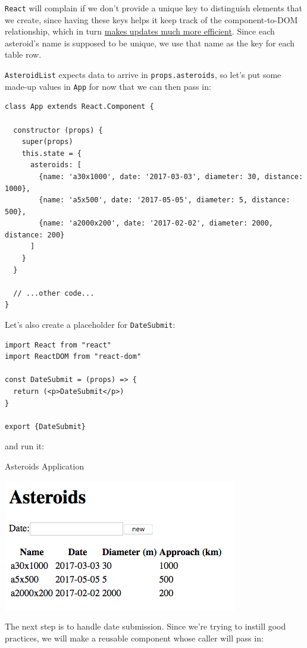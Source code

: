 \texttt{React} will complain if we don't provide a unique key to
distinguish elements that we create, since having these keys helps it
keep track of the component-to-DOM relationship, which in turn
\href{https://stackoverflow.com/questions/28329382/understanding-unique-keys-for-array-children-in-react-js}{makes
updates much more efficient}. Since each asteroid's name is supposed to
be unique, we use that name as the key for each table row.

\texttt{AsteroidList} expects data to arrive in
\texttt{props.asteroids}, so let's put some made-up values in
\texttt{App} for now that we can then pass in:

\begin{verbatim}
class App extends React.Component {

  constructor (props) {
    super(props)
    this.state = {
      asteroids: [
        {name: 'a30x1000', date: '2017-03-03', diameter: 30, distance: 1000},
        {name: 'a5x500', date: '2017-05-05', diameter: 5, distance: 500},
        {name: 'a2000x200', date: '2017-02-02', diameter: 2000, distance: 200}
      ]
    }
  }

  // ...other code...
}
\end{verbatim}

Let's also create a placeholder for \texttt{DateSubmit}:

\begin{verbatim}
import React from "react"
import ReactDOM from "react-dom"

const DateSubmit = (props) => {
  return (<p>DateSubmit</p>)
}

export {DateSubmit}
\end{verbatim}

and run it:

Asteroids Application

\includegraphics{../../files/interactive-asteroids-screenshot.png}

The next step is to handle date submission. Since we're trying to
instill good practices, we will make a reusable component whose caller
will pass in:


